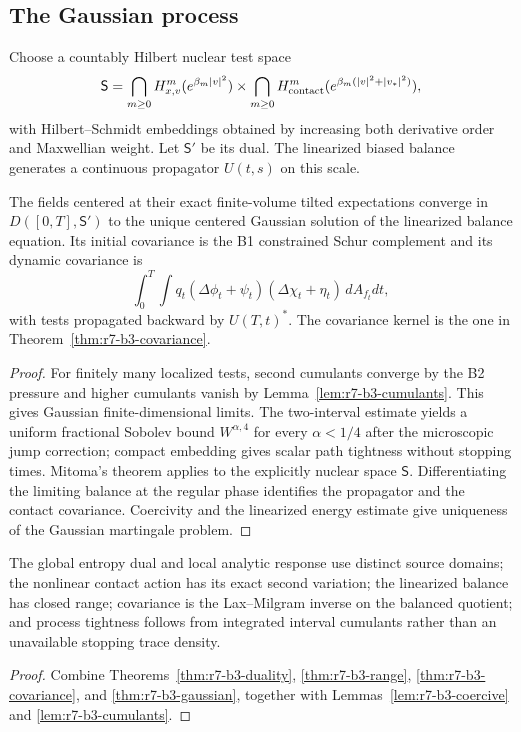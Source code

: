 \subsection{The Gaussian process}

Choose a countably Hilbert nuclear test space
\[
 \mathsf S=\bigcap_{m\ge0}H^{m}_{x,v}(e^{\beta_m|v|^2})
 \times\bigcap_{m\ge0}H^{m}_{\rm contact}
 (e^{\beta_m(|v|^2+|v_*|^2)}),
\]
with Hilbert--Schmidt embeddings obtained by increasing both derivative order
and Maxwellian weight.  Let $\mathsf S'$ be its dual.  The linearized biased
balance generates a continuous propagator $U(t,s)$ on this scale.

\begin{theorem}
\label{thm:r7-b3-gaussian}
The fields centered at their exact finite-volume tilted expectations converge
in $D([0,T],\mathsf S')$ to the unique centered Gaussian solution of the
linearized balance equation.  Its initial covariance is the B1 constrained
Schur complement and its dynamic covariance is
\[
 \int_0^T\int q_t
  (\Delta\phi_t+\psi_t)(\Delta\chi_t+\eta_t)
  \,dA_{f_t}dt,
\]
with tests propagated backward by $U(T,t)^*$.  The covariance kernel is the one
in Theorem~\ref{thm:r7-b3-covariance}.
\end{theorem}

\begin{proof}
For finitely many localized tests, second cumulants converge by the B2 pressure
and higher cumulants vanish by
Lemma~\ref{lem:r7-b3-cumulants}.  This gives Gaussian finite-dimensional
limits.  The two-interval estimate yields a uniform fractional Sobolev bound
$W^{\alpha,4}$ for every $\alpha<1/4$ after the microscopic jump correction;
compact embedding gives scalar path tightness without stopping times.  Mitoma's
theorem applies to the explicitly nuclear space $\mathsf S$.  Differentiating
the limiting balance at the regular phase identifies the propagator and the
contact covariance.  Coercivity and the linearized energy estimate give
uniqueness of the Gaussian martingale problem.
\end{proof}

\begin{theorem}
\label{thm:r7-b3-main}
The global entropy dual and local analytic response use distinct source
domains; the nonlinear contact action has its exact second variation; the
linearized balance has closed range; covariance is the Lax--Milgram inverse on
the balanced quotient; and process tightness follows from integrated interval
cumulants rather than an unavailable stopping trace density.
\end{theorem}

\begin{proof}
Combine Theorems~\ref{thm:r7-b3-duality},
\ref{thm:r7-b3-range},
\ref{thm:r7-b3-covariance}, and
\ref{thm:r7-b3-gaussian}, together with
Lemmas~\ref{lem:r7-b3-coercive} and
\ref{lem:r7-b3-cumulants}.
\end{proof}
